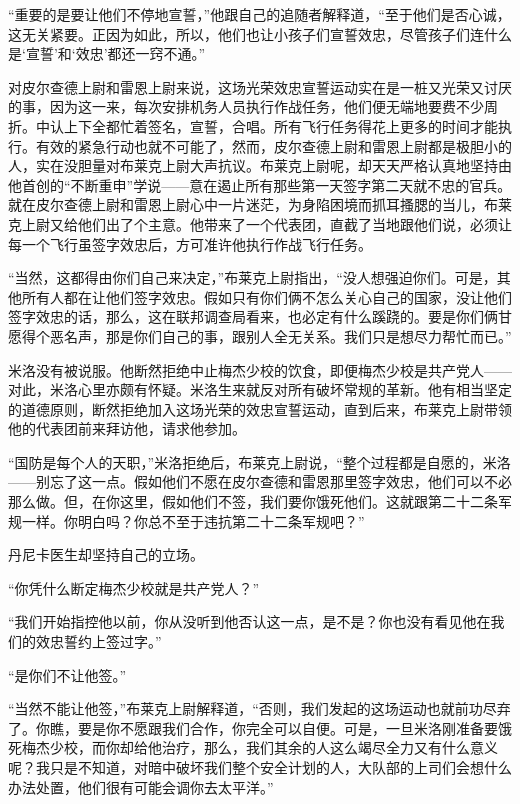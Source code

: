    “重要的是要让他们不停地宣誓，”他跟自己的追随者解释道，“至于他们是否心诚，这无关紧要。正因为如此，所以，他们也让小孩子们宣誓效忠，尽管孩子们连什么是‘宣誓’和‘效忠’都还一窍不通。”

 


    对皮尔查德上尉和雷恩上尉来说，这场光荣效忠宣誓运动实在是一桩又光荣又讨厌的事，因为这一来，每次安排机务人员执行作战任务，他们便无端地要费不少周折。中认上下全都忙着签名，宣誓，合唱。所有飞行任务得花上更多的时间才能执行。有效的紧急行动也就不可能了，然而，皮尔查德上尉和雷恩上尉都是极胆小的人，实在没胆量对布莱克上尉大声抗议。布莱克上尉呢，却天天严格认真地坚持由他首创的“不断重申”学说——意在遏止所有那些第一天签字第二天就不忠的官兵。就在皮尔查德上尉和雷恩上尉心中一片迷茫，为身陷困境而抓耳搔腮的当儿，布莱克上尉又给他们出了个主意。他带来了一个代表团，直截了当地跟他们说，必须让每一个飞行虽签字效忠后，方可准许他执行作战飞行任务。

    “当然，这都得由你们自己来决定，”布莱克上尉指出，“没人想强迫你们。可是，其他所有人都在让他们签字效忠。假如只有你们俩不怎么关心自己的国家，没让他们签字效忠的话，那么，这在联邦调查局看来，也必定有什么蹊跷的。要是你们俩甘愿得个恶名声，那是你们自己的事，跟别人全无关系。我们只是想尽力帮忙而已。”

    米洛没有被说服。他断然拒绝中止梅杰少校的饮食，即便梅杰少校是共产党人——对此，米洛心里亦颇有怀疑。米洛生来就反对所有破坏常规的革新。他有相当坚定的道德原则，断然拒绝加入这场光荣的效忠宣誓运动，直到后来，布莱克上尉带领他的代表团前来拜访他，请求他参加。

    “国防是每个人的天职，”米洛拒绝后，布莱克上尉说，“整个过程都是自愿的，米洛——别忘了这一点。假如他们不愿在皮尔查德和雷恩那里签字效忠，他们可以不必那么做。但，在你这里，假如他们不签，我们要你饿死他们。这就跟第二十二条军规一样。你明白吗？你总不至于违抗第二十二条军规吧？”

    丹尼卡医生却坚持自己的立场。

    “你凭什么断定梅杰少校就是共产党人？”

    “我们开始指控他以前，你从没听到他否认这一点，是不是？你也没有看见他在我们的效忠誓约上签过字。”

    “是你们不让他签。”

    “当然不能让他签，”布莱克上尉解释道，“否则，我们发起的这场运动也就前功尽弃了。你瞧，要是你不愿跟我们合作，你完全可以自便。可是，一旦米洛刚准备要饿死梅杰少校，而你却给他治疗，那么，我们其余的人这么竭尽全力又有什么意义呢？我只是不知道，对暗中破坏我们整个安全计划的人，大队部的上司们会想什么办法处置，他们很有可能会调你去太平洋。”

